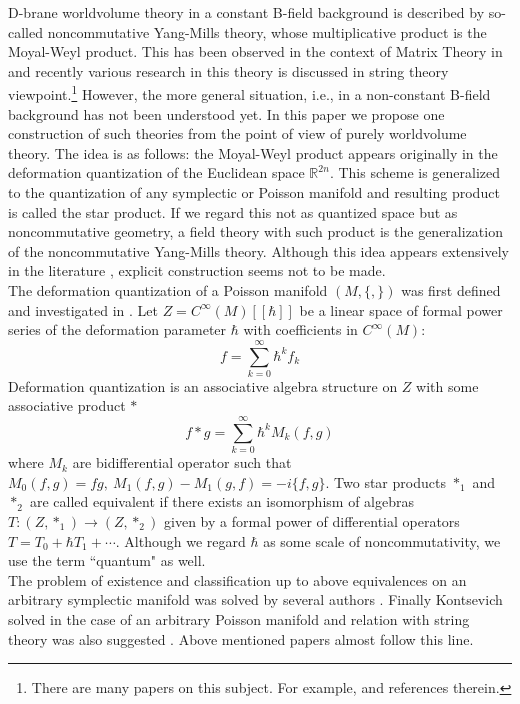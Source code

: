 \documentclass[10pt,a4paper]{article}
\def\h{\hbar}
\begin{document}
D-brane worldvolume theory in a constant B-field background is described by so-called noncommutative Yang-Mills theory, whose multiplicative product is the Moyal-Weyl product. This has been observed in the context of Matrix Theory in \cite{CDS}\cite{DH} and recently various research in this theory is discussed in string theory viewpoint.\footnote{
There are many papers on this subject. For example, \cite{SW}\cite{ALL} and references therein.
} However, the more general situation, i.e., in a non-constant B-field background has not been understood yet. In this paper we propose one construction of such theories from the point of view of purely worldvolume theory. The idea is as follows: the Moyal-Weyl product appears originally in the deformation quantization of the Euclidean space $\mathbb R^{2n}$. This scheme is generalized to the quantization of any symplectic or Poisson manifold and resulting product is called the star product. If we regard this not as quantized space but as noncommutative geometry, a field theory with such product is the generalization of the noncommutative Yang-Mills theory. Although this idea appears extensively in the literature \cite{HGC}, explicit construction seems not to be made.\\


The deformation quantization of a Poisson manifold $(M, \{,\})$ was first defined and investigated in \cite{Ko}.  Let $Z=C^\infty(M)[[\h]]$ be a linear space of formal power series of the deformation parameter $\h$ with coefficients in $C^\infty(M)$:
\begin{equation}
 f=\sum_{k=0}^\infty\h^kf_k
\end{equation}
Deformation quantization is an associative algebra structure on $Z$ with some associative product $*$
\begin{equation}
 f*g=\sum_{k=0}^\infty \h^k M_k(f,g)
\end{equation}
where $M_k$ are bidifferential operator such that $M_0(f,g)=fg,\ M_1(f,g)-M_1(g,f)=-i\{f,g\}$. Two star products $*_1$ and  $*_2$ are called equivalent if there exists an isomorphism of algebras $T:(Z,*_1)\rightarrow(Z,*_2)$ given by a formal power of differential operators $T=T_0+\h T_1+\cdots$. Although we regard $\h$ as some scale of noncommutativity, we use the term ``quantum" as well. \\

The problem of existence and classification up to above equivalences on an arbitrary symplectic manifold was solved by several authors \cite{BFFLS}\cite{DWL}. Finally Kontsevich \cite{Ko} solved in the case of an arbitrary Poisson manifold and relation with string theory was also suggested \cite{CF}. Above mentioned papers almost follow this line.\\
\end{document}
